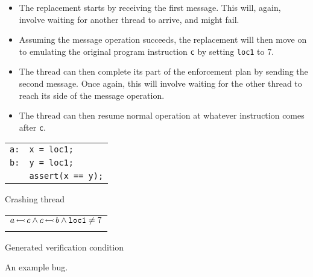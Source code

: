 \begin{itemize}
\item The replacement starts by receiving the first message.  This
  will, again, involve waiting for another thread to arrive, and might
  fail.
\item Assuming the message operation succeeds, the replacement will
  then move on to emulating the original program instruction {\tt c}
  by setting {\tt loc1} to 7.
\item The thread can then complete its part of the enforcement plan by
  sending the second message.  Once again, this will involve waiting
  for the other thread to reach its side of the message operation.
\item The thread can then resume normal operation at whatever
  instruction comes after {\tt c}.
\end{itemize}
\begin{sanefig}
  \begin{subfloat}
    \parbox{4.3cm}{
      \begin{tabular}{ll}
        {\tt a:} & {\tt x = loc1;}\\
        {\tt b:} & {\tt y = loc1;}\\
        & {\tt assert(x == y);}
      \end{tabular}
    }
    \caption{Crashing thread}
  \end{subfloat}
  {\hfill}
  {\hfill}
  \begin{subfloat}
    \begin{tabular}{>{\hfill}p{5cm}<{\hfill}}
      \\
      $a\,{\leftarrowtail}\,c \wedge c\,{\leftarrowtail}\,b \wedge \mathtt{loc1} \not= 7$\\
      \\
    \end{tabular}
    \caption{Generated verification condition}
  \end{subfloat}
  {\hfill}
  \caption{An example bug.}
  \label{fig:enforcement:example_bug}
\end{sanefig}
